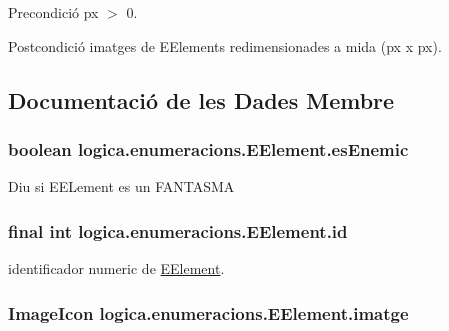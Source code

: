 \begin{DoxyPrecond}{Precondició}
px $>$ 0. 
\end{DoxyPrecond}
\begin{DoxyPostcond}{Postcondició}
imatges de E\+Elements redimensionades a mida (px x px). 
\end{DoxyPostcond}


\subsection{Documentació de les Dades Membre}
\hypertarget{enumlogica_1_1enumeracions_1_1_e_element_acd29ca18716c824e7921d94725497671}{
\subsubsection[{es\+Enemic}]{\setlength{\rightskip}{0pt plus 5cm}boolean logica.\+enumeracions.\+E\+Element.\+es\+Enemic\hspace{0.3cm}{\ttfamily [private]}}}\label{enumlogica_1_1enumeracions_1_1_e_element_acd29ca18716c824e7921d94725497671}
Diu si E\+E\+Lement es un F\+A\+N\+T\+A\+S\+M\+A \hypertarget{enumlogica_1_1enumeracions_1_1_e_element_a276fc494132bca06ef0e2e8490888a01}{
\subsubsection[{id}]{\setlength{\rightskip}{0pt plus 5cm}final int logica.\+enumeracions.\+E\+Element.\+id\hspace{0.3cm}{\ttfamily [private]}}}\label{enumlogica_1_1enumeracions_1_1_e_element_a276fc494132bca06ef0e2e8490888a01}
identificador numeric de \hyperlink{enumlogica_1_1enumeracions_1_1_e_element}{E\+Element}. \hypertarget{enumlogica_1_1enumeracions_1_1_e_element_a88d2ec584346f09066becb195b96d8a9}{
\subsubsection[{imatge}]{\setlength{\rightskip}{0pt plus 5cm}Image\+Icon logica.\+enumeracions.\+E\+Element.\+imatge\hspace{0.3cm}{\ttfamily [private]}}}\label{enumlogica_1_1enumeracions_1_1_e_element_a88d2ec584346f09066becb195b96d8a9}
